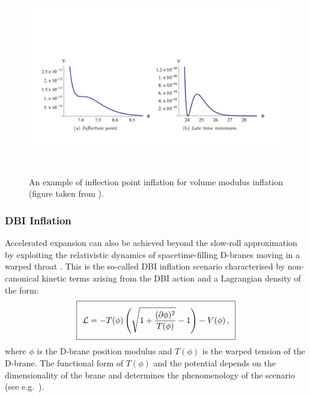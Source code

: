 \begin{figure}[t]
\begin{center}
\includegraphics[width=140mm,height=85mm]{Sections/Figures/InflectionPoint.pdf} 
 \vskip -25pt
\caption{An example of  inflection point inflation for  volume modulus inflation  (figure taken from \cite{Cicoli:2015wja}). } 
\label{Fig:VolInfl} 
\end{center}
\end{figure}


\subsubsection*{DBI Inflation}

Accelerated expansion can also be achieved beyond the slow-roll approximation by exploiting the relativistic dynamics of spacetime-filling D-branes moving in a warped throat \cite{Alishahiha:2004eh,Silverstein:2003hf}. This is the so-called DBI inflation scenario characterised by non-canonical kinetic terms arising from the DBI action and a Lagrangian density of the form:
\begin{equation}
\setlength\fboxsep{0.25cm}
\setlength\fboxrule{0.4pt}
\boxed{
\mathcal{L} = - T(\phi) \left(\sqrt{1+\frac{(\partial \phi)^2}{T(\phi)}}-1\right)-V(\phi)\,,
\label{LDBI}
}
\end{equation}
where $\phi$ is the D-brane position modulus and $T(\phi)$ is the warped tension of the D-brane. The functional form of $T(\phi)$ and the potential depends on the dimensionality of the brane and determines the phenomenology of the scenario (see e.g.~\cite{Shandera:2006ax,Bean:2007hc,Ma:2013xma}). 

